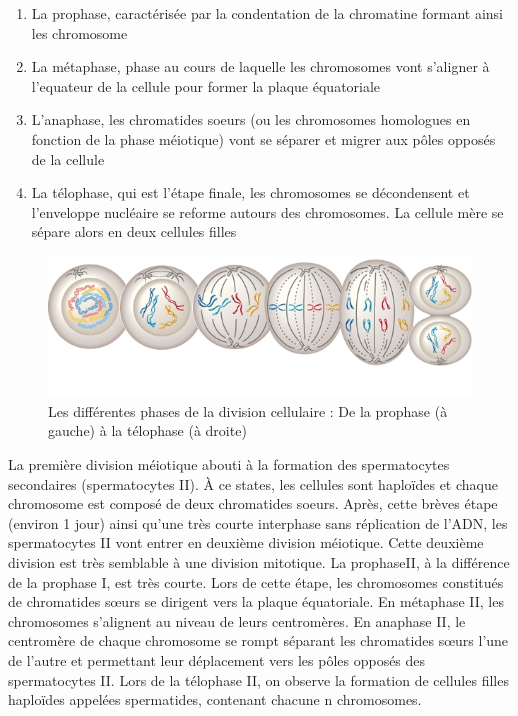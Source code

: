 \documentclass[12pt,twoside]{reedthesis}
\providecommand{\tightlist}{%
  \setlength{\itemsep}{0pt}\setlength{\parskip}{0pt}}
\theoremstyle{definition}
\theoremstyle{definition}
\theoremstyle{remark}
\begin{document}
  \begin{enumerate}
  \def\labelenumi{\arabic{enumi}.}
  \tightlist
  \item
    La prophase, caractérisée par la condentation de la chromatine formant
    ainsi les chromosome\\
  \item
    La métaphase, phase au cours de laquelle les chromosomes vont
    s'aligner à l'equateur de la cellule pour former la plaque
    équatoriale\\
  \item
    L'anaphase, les chromatides soeurs (ou les chromosomes homologues en
    fonction de la phase méiotique) vont se séparer et migrer aux pôles
    opposés de la cellule\\
  \item
    La télophase, qui est l'étape finale, les chromosomes se décondensent
    et l'enveloppe nucléaire se reforme autours des chromosomes. La
    cellule mère se sépare alors en deux cellules filles
  \end{enumerate}
  
  \begin{figure}
  
  {\centering \includegraphics[scale=.5]{figure/phases_mitose} 
  
  }
  
  \caption{Les différentes phases de la division cellulaire : De la prophase (à gauche) à la télophase (à droite) }\label{fig:mitose}
  \end{figure}
  
  La première division méiotique abouti à la formation des spermatocytes
  secondaires (spermatocytes II). À ce states, les cellules sont haploïdes
  et chaque chromosome est composé de deux chromatides soeurs. Après,
  cette brèves étape (environ 1 jour) ainsi qu'une très courte interphase
  sans réplication de l'ADN, les spermatocytes II vont entrer en deuxième
  division méiotique. Cette deuxième division est très semblable à une
  division mitotique. La prophaseII, à la différence de la prophase I, est
  très courte. Lors de cette étape, les chromosomes constitués de
  chromatides sœurs se dirigent vers la plaque équatoriale. En métaphase
  II, les chromosomes s'alignent au niveau de leurs centromères. En
  anaphase II, le centromère de chaque chromosome se rompt séparant les
  chromatides sœurs l'une de l'autre et permettant leur déplacement vers
  les pôles opposés des spermatocytes II. Lors de la télophase II, on
  observe la formation de cellules filles haploïdes appelées spermatides,
  contenant chacune n chromosomes.
  
\end{document}
